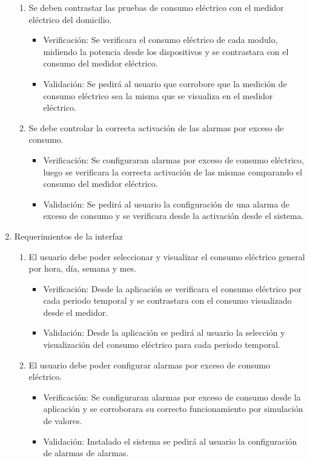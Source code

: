 \documentclass[
11pt, %
]{charter}
\begin{document}
\begin{enumerate}
\begin{enumerate}
		\item Se deben contrastar las pruebas de consumo eléctrico con el medidor eléctrico del domicilio.
			\begin{itemize}
			\item Verificación: Se verificara el consumo eléctrico de cada modulo, midiendo la potencia desde los dispositivos y se contrastara con el consumo del medidor eléctrico.
			\item Validación: Se pedirá al usuario que corrobore que la medición de consumo eléctrico sea la misma que se visualiza en el medidor eléctrico.
			\end{itemize}
		\item Se debe controlar la correcta activación de las alarmas por exceso de consumo.
		\begin{itemize}
			\item Verificación: Se configuraran alarmas por exceso de consumo eléctrico, luego se verificara la correcta activación de las mismas comparando el consumo del medidor eléctrico.
			\item Validación: Se pedirá al usuario la configuración de una alarma de exceso de consumo y se verificara desde la activación desde el sistema. 
			\end{itemize}				
		\end{enumerate}
	\item Requerimientos de la interfaz
		\begin{enumerate}
			\item El usuario debe poder seleccionar y visualizar el consumo eléctrico general por hora, día, semana y mes.
				\begin{itemize}
			\item Verificación: Desde la aplicación se verificara el consumo eléctrico por cada periodo temporal y se contrastara con el consumo visualizado desde el medidor.
			\item Validación: Desde la aplicación se pedirá al usuario la selección y visualización del consumo eléctrico para cada periodo temporal.
			\end{itemize}
			
			\item El usuario debe poder configurar alarmas por exceso de consumo eléctrico.	
			\begin{itemize}
			\item Verificación: Se configuraran alarmas por exceso de consumo desde la aplicación y se corroborara su correcto funcionamiento por simulación de valores.
			\item Validación: Instalado el sistema se pedirá al usuario la configuración de alarmas de alarmas.
			\end{itemize}
		 

\end{enumerate}
\end{enumerate}
\end{document}
